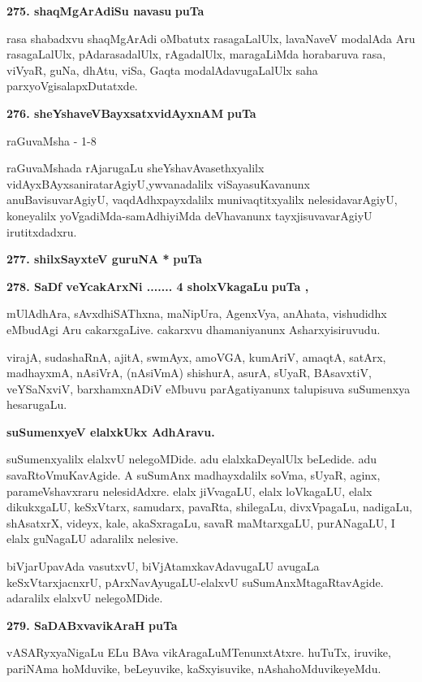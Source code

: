 \medskip
\noindent
\textbf{275. shaqMgArAdiSu navasu} \hfill{\bf puTa \pageref{218}}

\smallskip
rasa shabadxvu shaqMgArAdi oMbatutx rasagaLalUlx, lavaNaveV modalAda Aru rasagaLalUlx, pAdarasa\-dalUlx, rAgadalUlx, maragaLiMda horabaruva rasa, viVyaR, guNa, dhAtu, viSa, Gaqta modalAdavu\-gaLalUlx saha\- parxyoVgisalapxDutatxde.

\smallskip
\noindent
\textbf{276. sheYshaveVBayxsatxvidAyxnAM} \hfill{\bf puTa \pageref{28}}

\hfill{raGuvaMsha - 1-8}

raGuvaMshada rAjarugaLu sheYshavAvasethxyalilx vidAyxBAyxsaniratarAgiyU,\break ywvana\-dalilx viSayasuKa\-vanunx anuBavisuvarAgiyU, vaqdAdhxpayxdalilx munivaqtitx\-yalilx nelesidavarAgiyU, koneyalilx yoVga\-diMda-samAdhiyiMda deVhavanunx tayxjisuvavarAgiyU irutitxdadxru.

\medskip
\noindent
\textbf{277. shilxSayxteV guruNA *} \hfill{\bf puTa \pageref{190}}


\medskip
\noindent
\textbf{278. SaDf veYcakArxNi ....... 4 sholxVkagaLu} \hfill{\bf puTa \pageref{154}, \pageref{155}}

\smallskip
mUlAdhAra, sAvxdhiSAThxna, maNipUra, AgenxVya, anAhata, vishudidhx eMbudAgi Aru cakarxgaLive. cakarxvu dhamaniyanunx Asharxyisiruvudu.

\smallskip
virajA, sudashaRnA, ajitA, swmAyx, amoVGA, kumAriV, amaqtA, satArx, madhayxmA, nAsiVrA, (nAsiVmA) shishurA, asurA, sUyaR, BAsavxtiV, veYSaNxviV, barxhamxnADiV eMbuvu parAgatiyanunx talupisuva suSumenxya hesarugaLu.

\smallskip
\noindent
{\textbf{suSumenxyeV elalxkUkx AdhAravu.}}
\smallskip

suSumenxyalilx elalxvU nelegoMDide. adu elalxkaDeyalUlx beLedide. adu savaRtoVmuKa\-vAgide. A suSumAnx madhayxdalilx soVma, sUyaR, aginx, parameVshavxraru nelesidAdxre. elalx jiVvagaLU, elalx loVkagaLU, elalx dikukxgaLU, keSxVtarx, samudarx, pavaRta, shilegaLu, divxVpagaLu, nadigaLu, shAsatxrX, videyx, kale, akaSxragaLu, savaR maMtarxgaLU, purANagaLU, I elalx guNagaLU adaralilx nelesive.

biVjarUpavAda vasutxvU, biVjAtamxkavAdavugaLU avugaLa keSxVtarxjacnxrU, pArxNavAyugaLU-elalxvU suSumAnxMtagaRtavAgide. adaralilx elalxvU nelegoMDide.

\medskip
\noindent
\textbf{279. SaDABxvavikAraH} \hfill{\bf puTa \pageref{226}}

\smallskip
vASARyxyaNigaLu ELu BAva vikAragaLuMTenunxtAtxre. huTuTx, iruvike, pariNAma hoMduvike, beLeyuvike, kaSxyisuvike, nAshahoMduvikeyeMdu.

